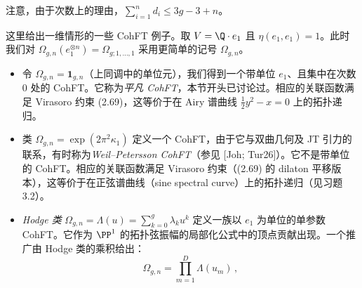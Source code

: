 注意，由于次数上的理由，$\sum_{i=1}^{n}d_{i}\le 3g-3+n$。


\begin{example}[3.2]
这里给出一维情形的一些 CohFT 例子。取 $V=\Q\cdot e_{1}$ 且 $\eta(e_{1},e_{1})=1$。此时我们对 $\Omega_{g,n}(e_{1}^{\otimes n})=\Omega_{g;1,\dots,1}$ 采用更简单的记号 $\Omega_{g,n}$。
\begin{itemize}
  \item 令 $\Omega_{g,n}=\mathbf{1}_{g,n}$（上同调中的单位元），我们得到一个带单位 $e_{1}$、且集中在次数 $0$ 处的 CohFT。它称为\emph{平凡 CohFT}，本节开头已讨论过。相应的关联函数满足 Virasoro 约束 (2.69)，这等价于在 Airy 谱曲线 $\frac{1}{2}y^{2}-x=0$ 上的拓扑递归。
  \item 类 $\Omega_{g,n}=\exp(2\pi^{2}\kappa_{1})$ 定义一个 CohFT，由于它与双曲几何及 JT 引力的联系，有时称为\emph{Weil--Petersson CohFT}（参见 [Joh; Tur26]）。它不是带单位的 CohFT。相应的关联函数满足 Virasoro 约束（(2.69) 的 dilaton 平移版本），这等价于在正弦谱曲线（sine spectral curve）上的拓扑递归（见习题 3.2）。
  \item \emph{Hodge 类} $\Omega_{g,n}=\Lambda(u)=\sum_{k=0}^{g}\lambda_{k}u^{k}$ 定义一族以 $e_{1}$ 为单位的单参数 CohFT。它作为 $\PP^{1}$ 的拓扑弦振幅的局部化公式中的顶点贡献出现。一个推广由 Hodge 类的乘积给出：
  \begin{equation}
    \Omega_{g,n}=\prod_{m=1}^{D}\Lambda(u_{m})\,,
    \tag{3.17}
  \end{equation}

\end{itemize}
\end{example}
